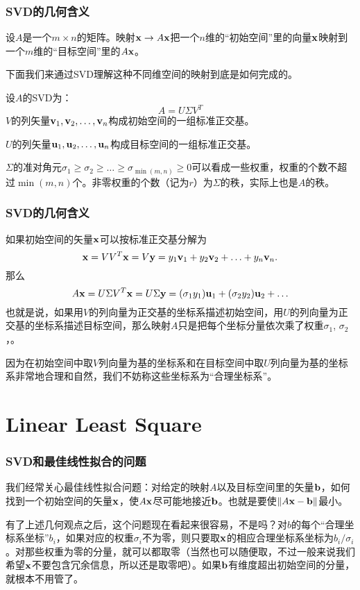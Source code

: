 \documentclass[CJK]{beamer}
\begin{document}
    \begin{frame}
    \frametitle{SVD的几何含义}
    设$A$是一个$m\times n$的矩阵。映射${\mathbf{x}}\rightarrow A{\mathbf{x}}$把一个$n$维的“初始空间”里的向量${\mathbf{x}}$映射到一个$m$维的“目标空间”里的$A{\mathbf{x}}$。

    \skipline
    
    下面我们来通过SVD理解这种不同维空间的映射到底是如何完成的。

    \skipline
    
    设$A$的SVD为：
    $$ A = U \Sigma V^T $$
    $V$的列矢量${\mathbf{v}}_1, {\mathbf{v}}_2,\ldots, {\mathbf{v}}_n$构成初始空间的一组标准正交基。
 
    $U$的列矢量${\mathbf{u}}_1, {\mathbf{u}}_2,\ldots, {\mathbf{u}}_n$构成目标空间的一组标准正交基。

    $\Sigma$的准对角元$\sigma_1\ge\sigma_2\ge\ldots\ge\sigma_{\min(m,n)}\ge 0$可以看成一些权重，权重的个数不超过$\min(m,n)$个。非零权重的个数（记为$r$）为$\Sigma$的秩，实际上也是$A$的秩。
    \end{frame}

    \begin{frame}
    \frametitle{SVD的几何含义}    
    如果初始空间的矢量${\mathbf{x}}$可以按标准正交基分解为
    $${\mathbf{x}} = VV^T{\mathbf{x}} = V{\mathbf{y}} = y_1 {\mathbf{v}}_1  + y_2 {\mathbf{v}}_2 + \ldots + y_n{\mathbf{v}}_n.$$
    那么
    $$ A {\mathbf{x}} = U\Sigma V^T{\mathbf{x}} = U \Sigma {\mathbf{y}} = (\sigma_1y_1){\mathbf{u}}_1 + (\sigma_2y_2){\mathbf{u}}_2+\ldots $$
    也就是说，如果用$V$的列向量为正交基的坐标系描述初始空间，用$U$的列向量为正交基的坐标系描述目标空间，那么映射$A$只是把每个坐标分量依次乘了权重$\sigma_1$, $\sigma_2$，。

    \skipline

    因为在初始空间中取$V$列向量为基的坐标系和在目标空间中取$U$列向量为基的坐标系非常地合理和自然，我们不妨称这些坐标系为“合理坐标系”。


    \end{frame}


    \section{Linear Least Square}
    
    \begin{frame}
      \frametitle{SVD和最佳线性拟合的问题}
      我们经常关心最佳线性拟合问题：对给定的映射$A$以及目标空间里的矢量${\mathbf{b}}$，如何找到一个初始空间的矢量${\mathbf{x}}$，使$A{\mathbf{x}}$尽可能地接近${\mathbf{b}}$。也就是要使$\lVert A{\mathbf{x}} - {\mathbf{b}}\rVert$最小。

      \skipline
      
      有了上述几何观点之后，这个问题现在看起来很容易，不是吗？对$b$的每个“合理坐标系坐标”$b_i$，如果对应的权重$\sigma_i$不为零，则只要取${\mathbf{x}}$的相应合理坐标系坐标为$b_i/\sigma_i$。对那些权重为零的分量，就可以都取零（当然也可以随便取，不过一般来说我们希望${\mathbf{x}}$不要包含冗余信息，所以还是取零吧）。如果${\mathbf{b}}$有维度超出初始空间的分量，就根本不用管了。
      
    \end{frame}
\end{document}

